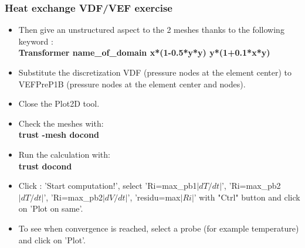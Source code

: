 \documentclass[10pt, hyperref={unicode=true,pdfusetitle, bookmarks=true,bookmarksnumbered=false,bookmarksopen=false, breaklinks=false,pdfborder={0 0 1},backref=true,colorlinks=true,linkcolor=darkblue,pageanchor}]{beamer}
\begin{document}
\begin{frame}
\frametitle{Heat exchange VDF/VEF exercise}
\begin{block}{}

\begin{itemize}
\item Then give an unstructured aspect to the 2 meshes thanks to the following keyword : \\
\textbf{Transformer name\_of\_domain \; x*(1-0.5*y*y) \; y*(1+0.1*x*y)}

\item Substitute the discretization VDF (pressure nodes at the element center) to VEFPreP1B (pressure nodes at the element center and nodes).

\item Close the Plot2D tool.

\item Check the meshes with: \\
\textbf{trust -mesh docond}

\item Run the calculation with:\\
\textbf{trust docond }

\item Click : 'Start computation!', select 'Ri=max\_pb1$|dT/dt|$', 'Ri=max\_pb2$|dT/dt|$', 'Ri=max\_pb2$|dV/dt|$', 'residu=max$|Ri|$' with "Ctrl" button and click on 'Plot on same'.

\item To see when convergence is reached, select a probe (for example temperature) and click on 'Plot'. 
\end{itemize}

\end{block}
\end{frame}
\end{document}

